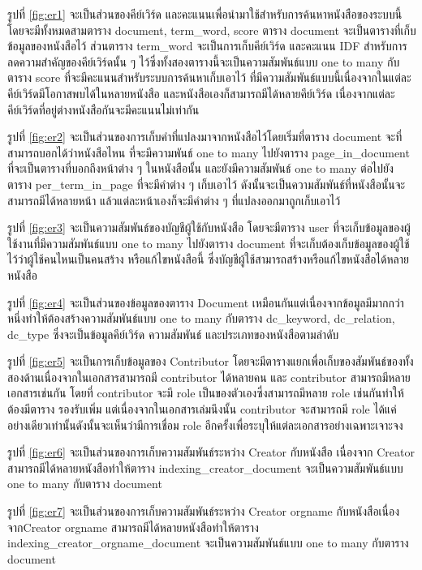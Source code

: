 รูปที่ \ref{fig:er1} จะเป็นส่วนของคีย์เวิร์ด และคะแนนเพื่อนำมาใช้สำหรับการค้นหาหนังสือของระบบนี้ โดยจะมีทั้งหมดสามตาราง document, term\_word, score ตาราง document จะเป็นตารางที่เก็บข้อมูลของหนังสือไว้ ส่วนตาราง term\_word จะเป็นการเก็บคีย์เวิร์ด และคะแนน IDF สำหรับการลดความสำคัญของคีย์เวิร์ดนั้น ๆ ไว้ซึ่งทั้งสองตารางนี้จะเป็นความสัมพันธ์แบบ one to many กับตาราง score ที่จะมีคะแนนสำหรับระบบการค้นหาเก็บเอาไว้ ที่มีความสัมพันธ์แบบนี้เนื่องจากในแต่ละคีย์เวิร์ดมีโอกาสพบได้ในหลายหนังสือ และหนังสือเองก็สามารถมีได้หลายคีย์เวิร์ด เนื่องจากแต่ละคีย์เวิร์ดที่อยู่ต่างหนังสือกันจะมีคะแนนไม่เท่ากัน

รูปที่ \ref{fig:er2} จะเป็นส่วนของการเก็บคำที่แปลงมาจากหนังสือไว้โดยเริ่มที่ตาราง document จะที่สามารถบอกได้ว่าหนังสือไหน ที่จะมีความพันธ์ one to many ไปยังตาราง page\_in\_document ที่จะเป็นตารางที่บอกถึงหน้าต่าง ๆ ในหนังสือนั้น และยังมีความสัมพันธ์ one to many ต่อไปยังตาราง per\_term\_in\_page ที่จะมีคำต่าง ๆ เก็บเอาไว้ ดังนั้นจะเป็นความสัมพันธ์ที่หนังสือนั้นจะสามารถมีได้หลายหน้า แล้วแต่ละหน้าเองก็จะมีคำต่าง ๆ ที่แปลงออกมาถูกเก็บเอาไว้

รูปที่ \ref{fig:er3} จะเป็นความสัมพันธ์ของบัญชีผู้ใช้กับหนังสือ โดยจะมีตาราง user ที่จะเก็บข้อมูลของผู้ใช้งานที่มีความสัมพันธ์แบบ one to many ไปยังตาราง document ที่จะเก็บต้องเก็บข้อมูลของผู้ใช้ไว้ว่าผู้ใช้คนไหนเป็นคนสร้าง หรือแก้ไขหนังสือนี้ ซึ่งบัญชีผู้ใช้สามารถสร้างหรือแก้ไขหนังสือได้หลายหนังสือ

รูปที่ \ref{fig:er4} จะเป็นส่วนของข้อมูลของตาราง Document เหมือนกันแต่เนื่องจากข้อมูลมีมากกว่าหนึ่งทำให้ต้องสร้างความสัมพันธ์แบบ one to many กับตาราง dc\_keyword, dc\_relation, dc\_type ซึ่งจะเป็นข้อมูลคีย์เวิร์ด ความสัมพันธ์ และประเภทของหนังสือตามลำดับ

รูปที่ \ref{fig:er5} จะเป็นการเก็บข้อมูลของ Contributor โดยจะมีตารางแยกเพื่อเก็บของสัมพันธ์ของทั้งสองด้านเนื่องจากในเอกสารสามารถมี contributor ได้หลายคน และ contributor สามารถมีหลายเอกสารเช่นกัน โดยที่ contributor จะมี role เป็นของตัวเองซึ่งสามารถมีหลาย role เช่นกันทำให้ต้องมีตาราง รองรับเพิ่ม แต่เนื่องจากในเอกสารเล่มนึงนั้น contributor จะสามารถมี role ได้แค่อย่างเดียวเท่านั้นดังนั้นจะเห็นว่ามีการเชื่อม role อีกครั้งเพื่อระบุให้แต่ละเอกสารอย่างเฉพาะเจาะจง

รูปที่ \ref{fig:er6} จะเป็นส่วนของการเก็บความสัมพันธ์ระหว่าง Creator กับหนังสือ เนื่องจาก Creator สามารถมีได้หลายหนังสือทำให้ตาราง indexing\_creator\_document จะเป็นความสัมพันธ์แบบ one to many กับตาราง document 

รูปที่ \ref{fig:er7} จะเป็นส่วนของการเก็บความสัมพันธ์ระหว่าง Creator orgname กับหนังสือเนื่อง จากCreator orgname สามารถมีได้หลายหนังสือทำให้ตาราง indexing\_creator\_orgname\_document จะเป็นความสัมพันธ์แบบ one to many กับตาราง document 

